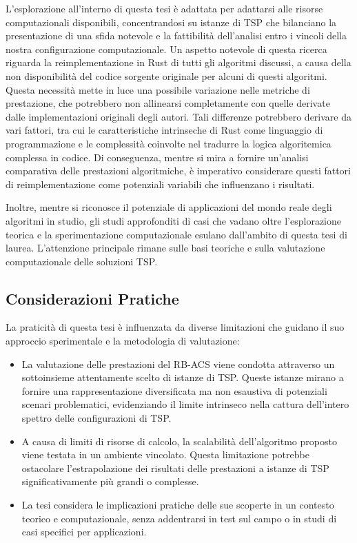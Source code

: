 L'esplorazione all'interno di questa tesi è adattata per adattarsi alle risorse computazionali disponibili, concentrandosi su istanze di \Gls{TSP} che bilanciano la presentazione di una sfida notevole e la fattibilità dell'analisi entro i vincoli della nostra configurazione computazionale. Un aspetto notevole di questa ricerca riguarda la reimplementazione in Rust di tutti gli algoritmi discussi, a causa della non disponibilità del codice sorgente originale per alcuni di questi algoritmi. Questa necessità mette in luce una possibile variazione nelle metriche di prestazione, che potrebbero non allinearsi completamente con quelle derivate dalle implementazioni originali degli autori. Tali differenze potrebbero derivare da vari fattori, tra cui le caratteristiche intrinseche di Rust come linguaggio di programmazione e le complessità coinvolte nel tradurre la logica algoritemica complessa in codice. Di conseguenza, mentre si mira a fornire un'analisi comparativa delle prestazioni algoritmiche, è imperativo considerare questi fattori di reimplementazione come potenziali variabili che influenzano i risultati.

Inoltre, mentre si riconosce il potenziale di applicazioni del mondo reale degli algoritmi in studio, gli studi approfonditi di casi che vadano oltre l'esplorazione teorica e la sperimentazione computazionale esulano dall'ambito di questa tesi di laurea. L'attenzione principale rimane sulle basi teoriche e sulla valutazione computazionale delle soluzioni \Gls{TSP}.

\subsection{Considerazioni Pratiche}

La praticità di questa tesi è influenzata da diverse limitazioni che guidano il suo approccio sperimentale e la metodologia di valutazione:

\begin{itemize}
  \item La valutazione delle prestazioni del \Gls{RB-ACS} viene condotta attraverso un sottoinsieme attentamente scelto di istanze di \Gls{TSP}.  Queste istanze mirano a fornire una rappresentazione diversificata ma non esaustiva di potenziali scenari problematici, evidenziando il limite intrinseco nella cattura dell'intero spettro delle configurazioni di \Gls{TSP}.
	\item A causa di limiti di risorse di calcolo, la scalabilità dell'algoritmo proposto viene testata in un ambiente vincolato. Questa limitazione potrebbe ostacolare l'estrapolazione dei risultati delle prestazioni a istanze di \Gls{TSP} significativamente più grandi o complesse.
	\item La tesi considera le implicazioni pratiche delle sue scoperte in un contesto teorico e computazionale, senza addentrarsi in test sul campo o in studi di casi specifici per applicazioni.
\end{itemize}

